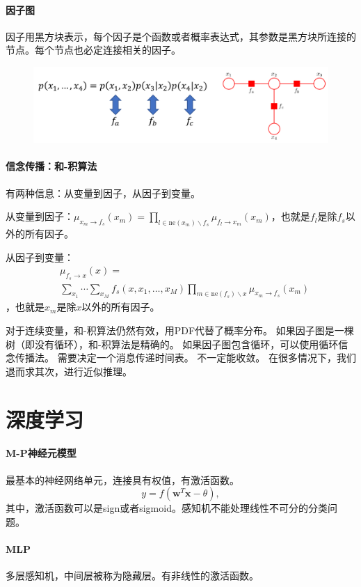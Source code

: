 \paragraph{因子图}
因子用黑方块表示，每个因子是个函数或者概率表达式，其参数是黑方块所连接的节点。每个节点也必定连接相关的因子。

\begin{figure}[H]
    \centering
\includegraphics[width=0.7\columnwidth]{factor.png}
\end{figure}

\paragraph{信念传播：和-积算法}
有两种信息：从变量到因子，从因子到变量。

从变量到因子：$\mu_{x_m \to f_s}(x_m) = \prod_{l \in \mathrm{ne}(x_m) \backslash f_s} \mu_{f_l \to x_m}(x_m)$，也就是$f_l$是除$f_s$以外的所有因子。

从因子到变量：$$
\begin{aligned}
&\mu_{f_s \to x}(x) = \\
&\sum_{x_1}\! \cdots\! \sum_{x_M}\! f_s(x,x_1,\! \ldots,\! x_M)\! \prod_{m \in \mathrm{ne}(f_s)\! \backslash\!  x}\! \mu_{x_m\! \to\! f_s}(x_m)
\end{aligned}
$$，也就是$x_m$是除$x$以外的所有因子。

对于连续变量，和-积算法仍然有效，用PDF代替了概率分布。
如果因子图是一棵树（即没有循环），和-积算法是精确的。
如果因子图包含循环，可以使用循环信念传播法。
需要决定一个消息传递时间表。
不一定能收敛。
在很多情况下，我们退而求其次，进行近似推理。

\section{深度学习}
\paragraph{M-P神经元模型}
最基本的神经网络单元，连接具有权值，有激活函数。
$$y = f(\bm w^T\bm x - \theta),$$
其中，激活函数可以是sign或者sigmoid。感知机不能处理线性不可分的分类问题。

\paragraph{MLP}
多层感知机，中间层被称为隐藏层。有非线性的激活函数。

